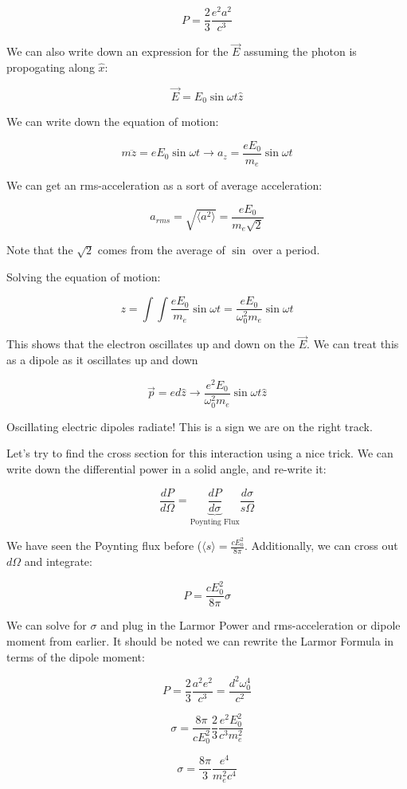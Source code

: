 \documentclass{article}
\def\Efield{{\vec {E}}}
\begin{document}
$$
P = \frac23 \frac{e^2 a^2}{c^3}
$$

We can also write down an expression for the $\Efield$ assuming the photon is propogating along $\hat x$:

$$
\vec{E} = E_0 \sin\omega t \hat z
$$

We can write down the equation of motion:

$$
m \ddot{z} = e E_0 \sin\omega t \rightarrow a_z = \frac{eE_0}{m_e}\sin \omega t
$$

We can get an rms-acceleration as a sort of average acceleration:

$$
a_{rms} = \sqrt{\langle a^2 \rangle} = \frac{e E_0}{m_e \sqrt{2}}
$$

Note that the $\sqrt{2}$ comes from the average of $\sin$ over a period. 

Solving the equation of motion:

$$
z = \int \int \frac{e E_0}{m_e} \sin \omega t = \frac{e E_0}{\omega_0^2 m_e} \sin \omega t
$$

This shows that the electron oscillates up and down on the $\Efield$. We can treat this as a dipole as it oscillates up and down

$$
\vec{p} = e d \hat{z} \rightarrow \frac{e^2 E_0}{\omega_0^2 m_e}\sin\omega t \hat{z}
$$

Oscillating electric dipoles radiate! This is a sign we are on the right track.

Let's try to find the cross section for this interaction using a nice trick. We can write down the differential power in a solid angle, and re-write it:

$$
\frac{d P }{d\Omega} = \underbrace{\frac{d P }{d\sigma}}_\text{Poynting Flux} \frac{d\sigma}{s\Omega}
$$

We have seen the Poynting flux before ($\langle s \rangle = \frac{c E_0^2}{8\pi}$. Additionally, we can cross out $d\Omega$ and integrate:

$$
P = \frac{c E_0^2}{8\pi } \sigma
$$

We can solve for $\sigma$ and plug in the Larmor Power and rms-acceleration or dipole moment from earlier. It should be noted we can rewrite the Larmor Formula in terms of the dipole moment:

$$
P = \frac23 \frac{a^2 e^2}{c^3} = \frac{d^2 \omega_0^4}{c^2}
$$

$$
\sigma = \frac{8\pi}{c E_0^2} \frac{2}{3}\frac{e^2 E_0^2}{c^3 m_e^2}
$$

$$
\boxed{\sigma = \frac{8\pi}{3} \frac{e^4}{m_e^2 c^4}}
$$
\end{document}
